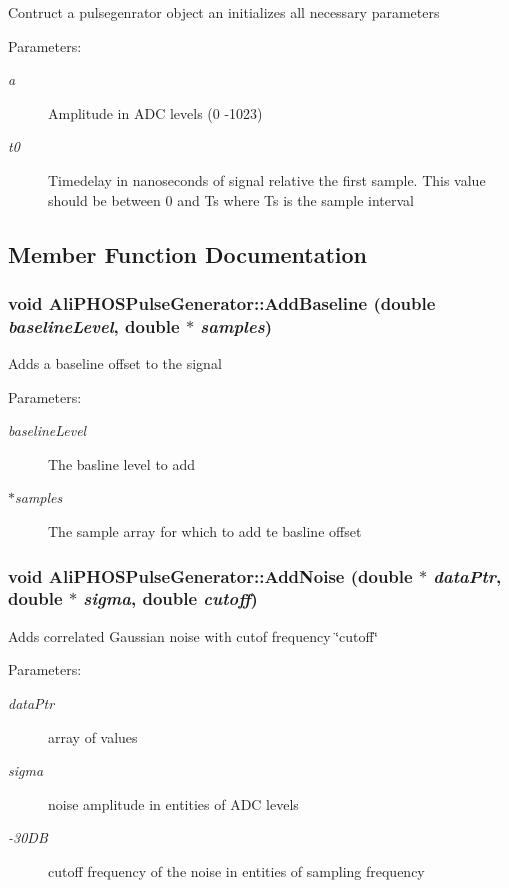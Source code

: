 Contruct a pulsegenrator object an initializes all necessary parameters \begin{Desc}
\item[Parameters:]
\begin{description}
\item[{\em a}]Amplitude in ADC levels (0 -1023) \item[{\em t0}]Timedelay in nanoseconds of signal relative the first sample. This value should be between 0 and Ts where Ts is the sample interval \end{description}
\end{Desc}


\subsection{Member Function Documentation}
\subsubsection{\setlength{\rightskip}{0pt plus 5cm}void Ali\-PHOSPulse\-Generator::Add\-Baseline (double {\em baseline\-Level}, double $\ast$ {\em samples})}\label{classAliPHOSPulseGenerator_a3}


Adds a baseline offset to the signal \begin{Desc}
\item[Parameters:]
\begin{description}
\item[{\em baseline\-Level}]The basline level to add \item[{\em $\ast$samples}]The sample array for which to add te basline offset \end{description}
\end{Desc}
\subsubsection{\setlength{\rightskip}{0pt plus 5cm}void Ali\-PHOSPulse\-Generator::Add\-Noise (double $\ast$ {\em data\-Ptr}, double $\ast$ {\em sigma}, double {\em cutoff})}\label{classAliPHOSPulseGenerator_a6}


Adds correlated Gaussian noise with cutof frequency \char`\"{}cutoff\char`\"{} \begin{Desc}
\item[Parameters:]
\begin{description}
\item[{\em data\-Ptr}]array of values \item[{\em sigma}]noise amplitude in entities of ADC levels \item[{\em -30DB}]cutoff frequency of the noise in entities of sampling frequency \end{description}
\end{Desc}
